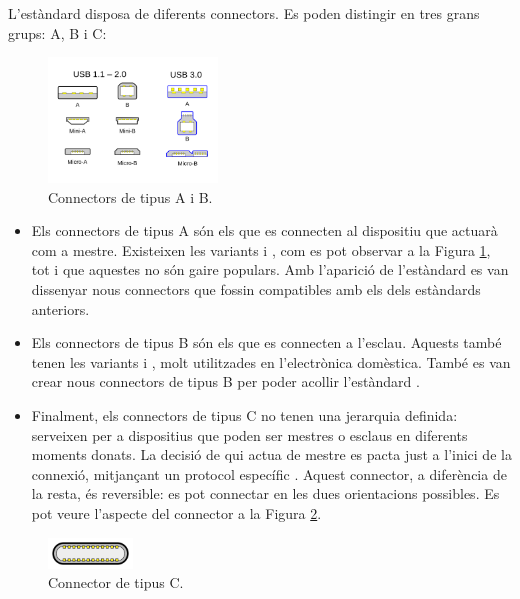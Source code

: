 L'estàndard  disposa de diferents connectors. Es poden distingir en
tres grans grups: A, B i C:

\begin{figure}[ht]
    \centering
    \includegraphics[width=0.4\textwidth]{images/usb_connectors.png}
    \caption{Connectors  de tipus A i B. \cite{Contributors2024USB}}
    \label{fig:usb_connectors}
\end{figure}

\begin{itemize}
    \item Els connectors de tipus A són els que es connecten al dispositiu
    que actuarà com a mestre. Existeixen les variants  i ,
    com es pot observar a la Figura \ref{fig:usb_connectors}, tot i que aquestes
    no són gaire populars. Amb l'aparició de l'estàndard  es van
    dissenyar nous connectors que fossin compatibles amb els dels estàndards
    anteriors.
    \item Els connectors de tipus B són els que es connecten a l'esclau. Aquests
    també tenen les variants  i , molt utilitzades
    en l'electrònica domèstica. També es van crear nous connectors de tipus B
    per poder acollir l'estàndard .
    \item Finalment, els connectors de tipus C no tenen una jerarquia definida:
    serveixen per a dispositius que poden ser mestres o esclaus en diferents
    moments donats. La decisió de qui actua de mestre es pacta just a l'inici
    de la connexió, mitjançant un protocol específic \cite{Axelson2015USB}.
    Aquest connector, a diferència de la resta, és reversible: es pot connectar
    en les dues orientacions possibles. Es pot veure l'aspecte del connector
    a la Figura \ref{fig:usb_connectors_c}.
\end{itemize}

\begin{figure}[ht]
    \centering
    \includegraphics[width=0.2\textwidth]{images/usb_c.png}
    \caption{Connector  de tipus C. \cite{Contributors2024USB}}
    \label{fig:usb_connectors_c}
\end{figure}

